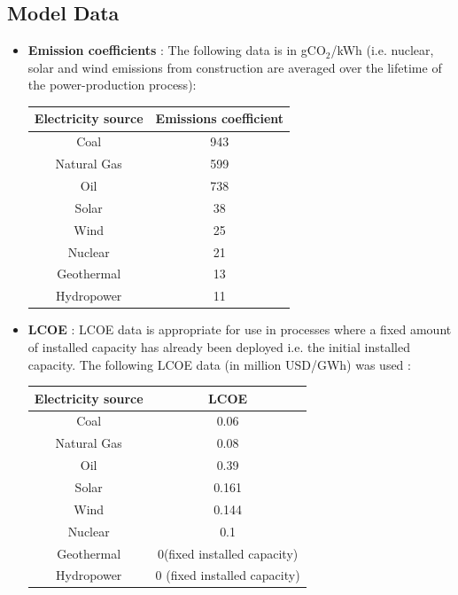 \documentclass[14pt,a4paper]{article} %
\begin{document}
\subsection{Model Data}
\begin{itemize}

\item \textbf{Emission coefficients} \cite{noauthor_electricity_2017}: The following data is in gCO$_2$/kWh (i.e. nuclear, solar and wind emissions from construction are averaged over the lifetime of the power-production process):

\begin{tabular}{|c|c|}
\hline
\textbf{Electricity source} & \textbf{Emissions coefficient}\\
\hline
Coal & 943 \\
\hline
Natural Gas & 599 \\
\hline
Oil & 738 \\
\hline
Solar & 38 \\
\hline
Wind & 25 \\
\hline
Nuclear & 21 \\
\hline
Geothermal & 13 \\
\hline
Hydropower & 11 \\
\hline
\end{tabular}

\item \textbf{\gls{LCOE}}\cite{noauthor_lazards_2017} : \gls{LCOE} data is appropriate for use in processes where a fixed amount of installed  capacity has already been deployed i.e. the initial installed  capacity. The following \gls{LCOE} data (in million USD/GWh) was used :\\

\begin{tabular}{|c|c|}
\hline
\textbf{Electricity source} & \textbf{LCOE}\\
\hline
Coal & 0.06 \\
\hline
Natural Gas & 0.08 \\
\hline
Oil & 0.39 \\
\hline
Solar & 0.161 \\
\hline
Wind & 0.144 \\
\hline
Nuclear & 0.1 \\
\hline
Geothermal & 0(fixed installed  capacity) \\
\hline
Hydropower & 0 (fixed installed  capacity) \\
\hline
\end{tabular}


\end{itemize}
\end{document}
